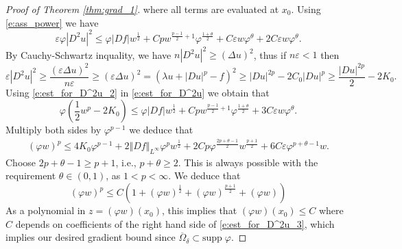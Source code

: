 \documentclass[11pt,reqno]{amsart}
\numberwithin{figure}{section}
\theoremstyle{plain}
\theoremstyle{remark}
\numberwithin{equation}{section}
\begin{document}
\begin{appendices}
\begin{proof}[Proof of Theorem \ref{thm:grad_1}]
where all terms are evaluated at $x_0$. Using \eqref{e:ass_power} we have
\begin{equation}\label{e:est_for_D^2u}
    \varepsilon \varphi|D^2u|^2 \leq  \varphi |Df|w^{\frac{1}{2}}+ Cp w^{\frac{p-1}{2}+1} \varphi^{\frac{1+\theta}{2}} + C\varepsilon w \varphi^{\theta} + 2C\varepsilon  w\varphi^\theta.
\end{equation}
By Cauchy-Schwartz inquality, we have $n|D^2u|^2\geq (\Delta u)^2$, thus if $n\varepsilon < 1$ then
\begin{equation}\label{e:est_for_D^2u_2}
    \varepsilon |D^2u|^2 \geq \frac{(\varepsilon \Delta u)^2}{n\varepsilon} \geq (\varepsilon \Delta u)^2 = \left(\lambda u + |Du|^p - f\right)^2 \geq |Du|^{2p} - 2C_0|Du|^p \geq \frac{|Du|^{2p}}{2} - 2K_0.
\end{equation}
Using \eqref{e:est_for_D^2u_2} in \eqref{e:est_for_D^2u} we obtain that
\begin{equation*}
    \varphi\left(\frac{1}{2}w^p - 2K_0\right) \leq \varphi |Df|w^{\frac{1}{2}}+ Cp w^{\frac{p-1}{2}+1} \varphi^{\frac{1+\theta}{2}} + 3C\varepsilon w \varphi^{\theta}.
\end{equation*}
Multiply both sides by $\varphi^{p-1}$ we deduce that
\begin{align*}
    (\varphi w)^p \leq 4K_0\varphi^{p-1} + 2\Vert Df\Vert_{L^\infty}\varphi^p w^{\frac{1}{2}} + 2Cp \varphi^{\frac{2p+\theta - 1}{2}}w^{\frac{p+1}{2}} + 6C\varepsilon \varphi^{p+\theta - 1}w.
\end{align*}
Choose $2p+\theta -1 \geq p+1$, i.e., $p+\theta\geq 2$. This is always possible with the requirement $\theta \in (0,1)$, as $1<p <\infty$. We deduce that 
\begin{equation}\label{e:est_for_D^2u_3}
    (\varphi w)^p \leq C\left(1+ (\varphi w)^\frac{1}{2} + (\varphi w)^\frac{p+1}{2} +(\varphi w)\right)
\end{equation}
As a polynomial in $z = (\varphi w)(x_0)$, this implies that $(\varphi w)(x_0)\leq C$ where $C$ depends on coefficients of the right hand side of \eqref{e:est_for_D^2u_3}, which implies our desired gradient bound since $\overline{\Omega}_\delta\subset \mathrm{supp}\;\varphi$.
\end{proof}




\end{appendices}
\end{document}
